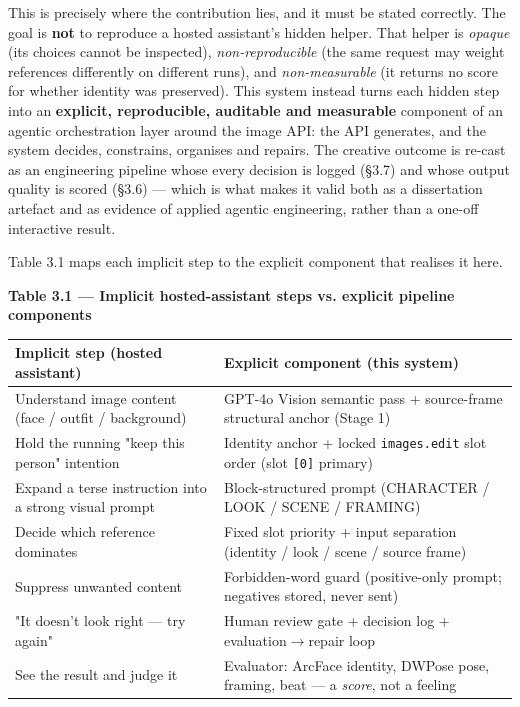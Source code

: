 \documentclass[10pt,twocolumn,letterpaper]{article}
\begin{document}
This is precisely where the contribution lies, and it must be stated correctly. The goal is \textbf{not} to reproduce a hosted assistant's hidden helper. That helper is \emph{opaque} (its choices cannot be inspected), \emph{non-reproducible} (the same request may weight references differently on different runs), and \emph{non-measurable} (it returns no score for whether identity was preserved). This system instead turns each hidden step into an \textbf{explicit, reproducible, auditable and measurable} component of an agentic orchestration layer around the image API: the API generates, and the system decides, constrains, organises and repairs. The creative outcome is re-cast as an engineering pipeline whose every decision is logged (\S{}3.7) and whose output quality is scored (\S{}3.6) --- which is what makes it valid both as a dissertation artefact and as evidence of applied agentic engineering, rather than a one-off interactive result.

Table 3.1 maps each implicit step to the explicit component that realises it here.

\begin{table}[t]
\centering
{\footnotesize\textbf{\textbf{Table 3.1 --- Implicit hosted-assistant steps vs. explicit pipeline components}}}\par\vspace{3pt}
\footnotesize
\begin{tabularx}{\textwidth}{>{\RaggedRight\arraybackslash}X>{\RaggedRight\arraybackslash}X}
\toprule
Implicit step (hosted assistant) & Explicit component (this system) \\
\midrule
Understand image content (face / outfit / background) & GPT-4o Vision semantic pass + source-frame structural anchor (Stage 1) \\
Hold the running "keep this person" intention & Identity anchor + locked \texttt{images.edit} slot order (slot \texttt{[0]} primary) \\
Expand a terse instruction into a strong visual prompt & Block-structured prompt (CHARACTER / LOOK / SCENE / FRAMING) \\
Decide which reference dominates & Fixed slot priority + input separation (identity / look / scene / source frame) \\
Suppress unwanted content & Forbidden-word guard (positive-only prompt; negatives stored, never sent) \\
"It doesn't look right --- try again" & Human review gate + decision log + evaluation$\rightarrow$repair loop \\
See the result and judge it & Evaluator: ArcFace identity, DWPose pose, framing, beat --- a \emph{score}, not a feeling \\
\bottomrule
\end{tabularx}
\end{table}
\end{document}
